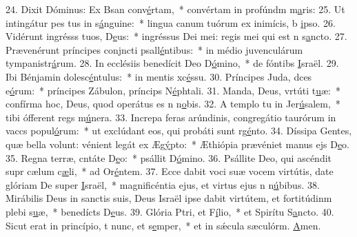 24. Dixit Dóminus: Ex Bsan conv\uline{é}rtam,~* convértam in profúndm m\uline{a}ris:
25. Ut intingátur pes tus in s\uline{á}nguine:~* lingua canum tuórum ex inimícis, b \uline{i}pso.
26. Vidérunt ingrésss tuos, D\uline{e}us:~* ingréssus Dei mei: regis mei qui est n s\uline{a}ncto.
27. Prævenérunt príncipes conjncti psall\uline{é}ntibus:~* in médio juvenculárum tympanistr\uline{á}rum.
28. In ecclésiis benedícit Deo D\uline{ó}mino,~* de fóntibs \uline{I}sraël.
29. Ibi Bénjamin dolesc\uline{é}ntulus:~* in mentis xc\uline{é}ssu.
30. Príncipes Juda, dces e\uline{ó}rum:~* príncipes Zábulon, príncips N\uline{é}phtali.
31. Manda, Deus, vrtúti t\uline{u}æ:~* confírma hoc, Deus, quod operátus es n n\uline{o}bis.
32. A templo tu in Jer\uline{ú}salem,~* tibi ófferent regs m\uline{ú}nera.
33. Increpa feras arúndinis, congregátio taurórum in vaccs popul\uline{ó}rum:~* ut exclúdant eos, qui probáti sunt rg\uline{é}nto.
34. Díssipa Gentes, quæ bella volunt: vénient legát ex Æg\uline{ý}pto:~* Æthiópia prævéniet manus ejs D\uline{e}o.
35. Regna terræ, cntáte D\uline{e}o:~* psállit D\uline{ó}mino.
36. Psállite Deo, qui ascéndit supr cælum c\uline{æ}li,~* ad Or\uline{é}ntem.
37. Ecce dabit voci suæ vocem virtútis, date glóriam De super \uline{I}sraël,~* magnificéntia ejus, et virtus ejus n n\uline{ú}bibus.
38. Mirábilis Deus in sanctis suis, Deus Israël ipse dabit virtútem, et fortitúdinm plebi s\uline{u}æ,~* benedícts D\uline{e}us.
39. Glória Ptri, et F\uline{í}lio,~* et Spirítu S\uline{a}ncto.
40. Sicut erat in princípio, t nunc, et s\uline{e}mper,~* et in sǽcula sæculórm. \uline{A}men.
